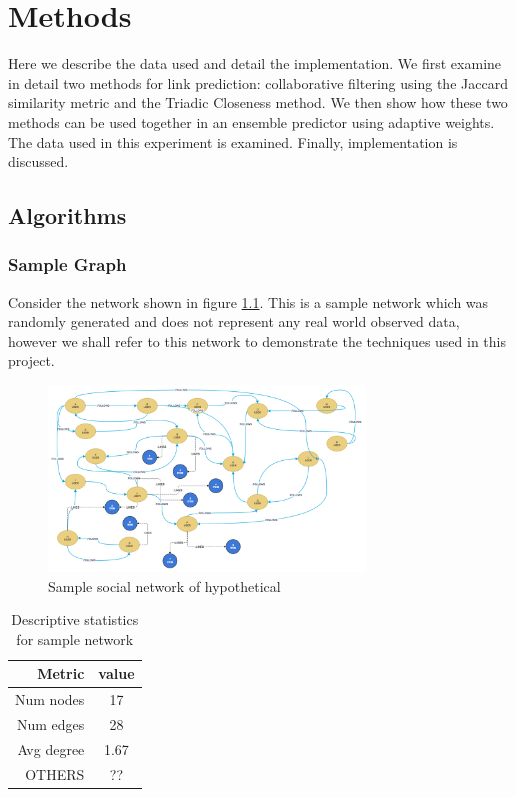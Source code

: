 
\chapter{Methods}
Here we describe the data used and detail the implementation. We first examine in detail two methods for link prediction: collaborative filtering using the Jaccard similarity metric and the Triadic Closeness method. We then show how these two methods can be used together in an ensemble predictor using adaptive weights. The data used in this experiment is examined. Finally, implementation is discussed. 

\section{Algorithms}


\subsection{Sample Graph}
Consider the network shown in figure \ref{thesis_sample_network}. This is a sample network which was randomly generated and does not represent any real world observed data, however we shall refer to this network to demonstrate the techniques used in this project.



\begin{figure}[H]
  \centering
  \includegraphics[width=0.75\textwidth]{images/thesis_sample_network_multimodal.png}
  \caption[Sample network]{Sample social network of hypothetical }
  \label{thesis_sample_network}
\end{figure}


\begin{table}[t]
\caption{Descriptive statistics for sample network}
\label{sample_network_stats}
\vskip 0.15in
\begin{center}
\begin{small}
\begin{sc}
\begin{tabular}{rc}
\hline
Metric & value\\
\hline
Num nodes & 17\\
Num edges & 28\\
Avg degree & 1.67\\
OTHERS & ??\\
\hline
\end{tabular}
\end{sc}
\end{small}
\end{center}
\vskip -0.1in
\end{table}

